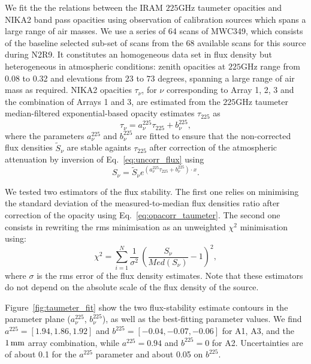 We fit the the relations between the IRAM
$225$GHz taumeter opacities and NIKA2 band pass opacities using
observation of calibration sources which spans a large range of air
masses. We use a series of 64 scans of MWC349, which consists of the
baseline selected sub-set of scans from the 68 available scans for
this source during N2R9.
It constitutes an homogeneous data set in flux density but
heterogeneous in atmospheric conditions: zenith opacities at $225$GHz
range from 0.08 to 0.32 and elevations from $23$ to $73$
degrees, spanning a large range of air mass as required. NIKA2 opacities
$\tau_\nu$, for $\nu$ corresponding
to Array 1, 2, 3 and the combination of Arrays 1 and 3, are estimated
from the $225$GHz taumeter median-filtered exponential-based opacity
estimates $\tau_{225}$ as
\begin{equation}  
  \tau_\nu =  a_\nu^{225}\tau_{225} + b_\nu^{225},          
\end{equation}
where the parameters $a_\nu^{225}$ and $b_\nu^{225}$ are fitted to ensure
that the non-corrected flux densities $\tilde{S}_\nu$ are stable againts
$\tau_{225}$ after correction of the atmospheric attenuation by
inversion of Eq.~\ref{eq:uncorr_flux} using 
\begin{equation}  
  S_\nu = \tilde{S}_\nu e^{(a_\nu^{225}\tau_{225} + b_\nu^{225}) \cdot x}.
  \label{eq:opacorr_taumeter}
\end{equation}

We tested two estimators of the flux stability. The first one relies
on minimising the standard deviation of the measured-to-median flux
densities ratio after correction of the opacity using
Eq.~\ref{eq:opacorr_taumeter}. The second one consists in rewriting
the rms minimisation as an unweighted $\chi^2$ minimisation using:
\begin{equation}
\chi^2 = \sum_{i=1}^{N} \frac{1}{\sigma^2} \, \left( \frac{S_\nu}{Med(S_\nu)} -1 \right)^2,  
\end{equation}
where $\sigma$ is the rms error of the flux density estimates. Note
that these estimators do not depend on
the absolute scale of the flux density of the source.

Figure~\ref{fig:taumeter_fit} show the two flux-stability estimate
contours in the parameter plane ($a_\nu^{225}$, $b_\nu^{225}$), as
well as the best-fitting parameter values. We find
$a^{225} = [1.94,  1.86, 1.92]$ and $b^{225} = [-0.04,  -0.07, -0.06]$
for A1, A3, and the $1\,\rm{mm}$ array combination, while $a^{225}=0.94$ and
$b^{225}=0$ for A2. Uncertainties are of about 0.1 for the $a^{225}$
parameter and about 0.05 on $b^{225}$. 

